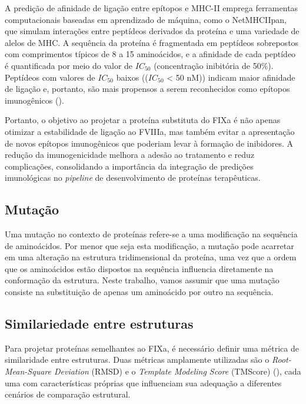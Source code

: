 A predição de afinidade de ligação entre epítopos e MHC-II emprega ferramentas computacionais 
baseadas em aprendizado de máquina,
como o NetMHCIIpan, que simulam interações entre peptídeos derivados da proteína e uma variedade de alelos de MHC. 
A sequência da proteína é fragmentada em peptídeos sobrepostos com comprimentos típicos de 8 a 15 aminoácidos,
e a afinidade de cada peptídeo é quantificada por meio do valor de $IC_{50}$ (concentração inibitória de 50\%).
Peptídeos com valores de $IC_{50}$ baixos (($IC_{50}$ < 50 nM)) indicam maior afinidade de ligação e, portanto, 
são mais propensos a serem reconhecidos como epítopos imunogênicos (\cite{Imuno}).

Portanto, o objetivo ao projetar a proteína substituta do FIXa é não apenas otimizar a estabilidade de ligação ao FVIIIa, 
mas também evitar a apresentação de novos epítopos imunogênicos que poderiam levar à formação de inibidores. 
A redução da imunogenicidade melhora a adesão ao tratamento e reduz complicações, 
consolidando a importância da integração de predições imunológicas 
no \textit{pipeline} de desenvolvimento de proteínas terapêuticas.


\subsection{Mutação}
Uma mutação no contexto de proteínas refere-se a uma modificação na sequência de aminoácidos. 
Por menor que seja esta modificação, a mutação pode acarretar em uma alteração na estrutura tridimensional da proteína,
uma vez que a ordem que os aminoácidos estão dispostos na sequência influencia diretamente na conformação da estrutura. 
Neste trabalho, vamos assumir que uma mutação consiste na substituição de apenas um aminoácido por outro na sequência. 

\subsection{Similariedade entre estruturas}
\label{subsection:TMScore}  
Para projetar proteínas semelhantes ao FIXa, é necessário definir uma métrica de similaridade entre estruturas.
Duas métricas amplamente utilizadas são o \textit{Root-Mean-Square Deviation} (RMSD) 
e o \textit{Template Modeling Score} (TMScore) (\cite{tmscore}),
cada uma com características próprias que influenciam sua adequação a diferentes cenários de comparação estrutural.

